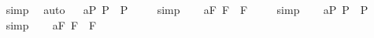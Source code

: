 \begin{isabellebody}
\isadelimproof
\ %
\endisadelimproof
%
\isatagproof
{}\isamarkupfalse%
\ simp\ \isamarkupfalse%
\ auto%
\endisatagproof
{\isafoldproof}%
%
\isadelimproof
%
\endisadelimproof
%
\isamarkuptrue%
\ \isamarkupfalse%
\ a{}{}{\isacharunderscore}{}{\isacharunderscore}P{\isacharcolon}\ {\isachardoublequoteopen}{\isacharbrackleft}\isactrlbold {\isasymA}{\isasymphi}\isactrlsup P\ \isactrlbold {\isasymrightarrow}\ \isactrlbold {\isasymbox}\isactrlbold {\isasymA}{\isasymphi}\isactrlsup P{\isacharbrackright}\ {\isacharequal}\ {\isasymtop}{\isachardoublequoteclose}%
\isadelimproof
\ %
\endisadelimproof
%
\isatagproof
{}\isamarkupfalse%
\ simp\ \isamarkupfalse%
%
\endisatagproof
{\isafoldproof}%
%
\isadelimproof
%
\endisadelimproof
\isanewline
\ \isamarkupfalse%
\ a{}{}{\isacharunderscore}{}{\isacharunderscore}F{\isacharcolon}\ {\isachardoublequoteopen}{\isacharbrackleft}\isactrlbold {\isasymA}{\isasymphi}\isactrlsup F\ \isactrlbold {\isasymrightarrow}\ \isactrlbold {\isasymbox}\isactrlbold {\isasymA}{\isasymphi}\isactrlsup F{\isacharbrackright}\ {\isacharequal}\ {\isasymtop}{\isachardoublequoteclose}%
\isadelimproof
\ %
\endisadelimproof
%
\isatagproof
{}\isamarkupfalse%
\ simp\ \isamarkupfalse%
%
\endisatagproof
{\isafoldproof}%
%
\isadelimproof
%
\endisadelimproof
\isanewline
\ \isamarkupfalse%
\ a{}{}{\isacharunderscore}{}{\isacharunderscore}P{\isacharcolon}\ {\isachardoublequoteopen}{\isacharbrackleft}\isactrlbold {\isasymbox}{\isasymphi}\isactrlsup P\ \isactrlbold {\isasymequiv}\ \isactrlbold {\isasymA}{\isacharparenleft}\isactrlbold {\isasymbox}{\isasymphi}\isactrlsup P{\isacharparenright}{\isacharbrackright}\ {\isacharequal}\ {\isasymtop}{\isachardoublequoteclose}%
\isadelimproof
\ %
\endisadelimproof
%
\isatagproof
{}\isamarkupfalse%
\ simp\ \isamarkupfalse%
%
\endisatagproof
{\isafoldproof}%
%
\isadelimproof
%
\endisadelimproof
\isanewline
\ \isamarkupfalse%
\ a{}{}{\isacharunderscore}{}{\isacharunderscore}F{\isacharcolon}\ {\isachardoublequoteopen}{\isacharbrackleft}\isactrlbold {\isasymbox}{\isasymphi}\isactrlsup F\ \isactrlbold {\isasymequiv}\ \isactrlbold {\isasymA}{\isacharparenleft}\isactrlbold {\isasymbox}{\isasymphi}\isactrlsup F{\isacharparenright}{\isacharbrackright}\ {\isacharequal}\ {\isasymtop}{\isachardoublequoteclose}%

\end{isabellebody}
